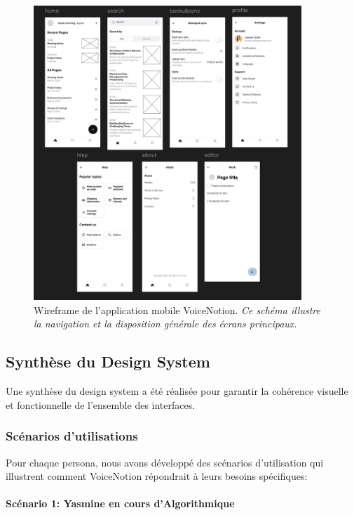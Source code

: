     \begin{figure}[H]
        \centering
        \includegraphics[width=0.9\textwidth]{assets/docs/mobile/wireframe_app-2.jpg}
        \caption{Wireframe de l'application mobile VoiceNotion. \newline\textit{Ce schéma illustre la navigation et la disposition générale des écrans principaux.}}
        \label{fig:wireframe_app_main}
    \end{figure}
    
    
    \subsection{Synthèse du Design System}
    
    Une synthèse du design system a été réalisée pour garantir la cohérence visuelle et fonctionnelle de l'ensemble des interfaces.
    
        
    \subsubsection{Scénarios d'utilisations}
    
    Pour chaque persona, nous avons développé des scénarios d'utilisation qui illustrent comment VoiceNotion répondrait à leurs besoins spécifiques:
    
    \paragraph{Scénario 1: Yasmine en cours d'Algorithmique}
    

